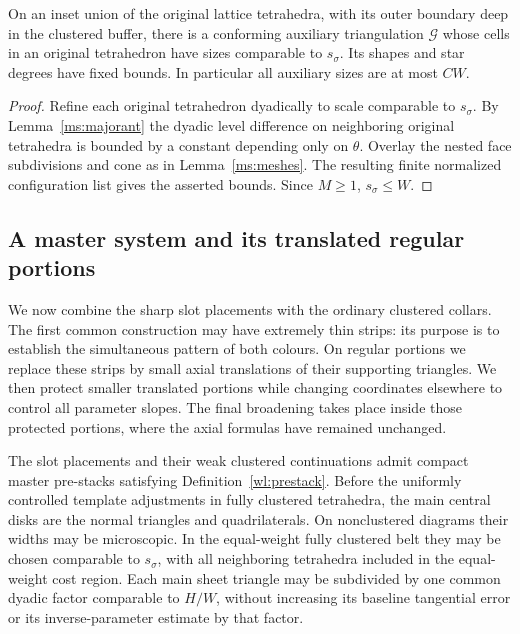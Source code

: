 \begin{lemma}
\label{ms:auxiliary}
On an inset union of the original lattice tetrahedra, with its outer
boundary deep in the clustered buffer, there is a conforming
auxiliary triangulation $\mathcal G$ whose cells in an original
tetrahedron have sizes comparable to $s_\sigma$.  Its shapes and
star degrees have fixed bounds.  In particular all auxiliary sizes
are at most $CW$.
\end{lemma}

\begin{proof}
Refine each original tetrahedron dyadically to scale comparable to
$s_\sigma$.  By Lemma~\ref{ms:majorant} the dyadic level difference on
neighboring original tetrahedra is bounded by a constant depending
only on $\theta$.  Overlay the nested face subdivisions and cone
as in Lemma~\ref{ms:meshes}.  The resulting finite normalized
configuration list gives the asserted bounds.  Since $M\ge1$,
$s_\sigma\le W$.
\end{proof}

\subsection{A master system and its translated regular portions}

We now combine the sharp slot placements with the ordinary clustered
collars.  The first common construction may have extremely thin strips:
its purpose is to establish the simultaneous pattern of both colours.
On regular portions we replace these strips by small axial translations
of their supporting triangles.  We then protect smaller translated
portions while changing coordinates elsewhere to control all parameter
slopes.  The final broadening takes place inside those protected
portions, where the axial formulas have remained unchanged.

\begin{lemma}
\label{ms:master}
The slot placements and their weak clustered continuations admit
compact master pre-stacks satisfying Definition~\ref{wl:prestack}.  Before the
uniformly controlled template adjustments in fully clustered tetrahedra,
the main central disks are the normal triangles and quadrilaterals.  On
nonclustered diagrams their widths may be microscopic.  In the
equal-weight fully clustered belt they may be chosen comparable to
$s_\sigma$, with all neighboring tetrahedra included in the
equal-weight cost region.  Each main sheet triangle may be
subdivided by one common dyadic factor comparable to $H/W$, without
increasing its baseline tangential error or its inverse-parameter
estimate by that factor.
\end{lemma}

